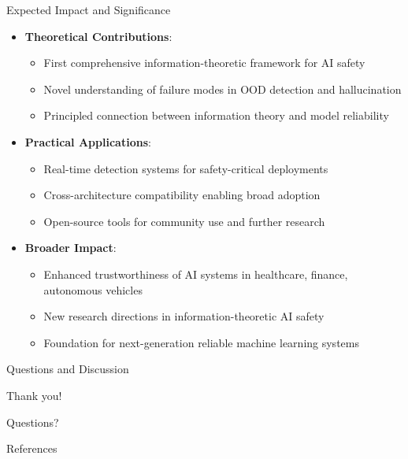 \documentclass[aspectratio=169]{beamer}
\begin{document}
\begin{frame}{Expected Impact and Significance}
\begin{itemize}
    \item \textbf{Theoretical Contributions}:
    \begin{itemize}
        \item First comprehensive information-theoretic framework for AI safety
        \item Novel understanding of failure modes in OOD detection and hallucination
        \item Principled connection between information theory and model reliability
    \end{itemize}
    \item \textbf{Practical Applications}:
    \begin{itemize}
        \item Real-time detection systems for safety-critical deployments
        \item Cross-architecture compatibility enabling broad adoption
        \item Open-source tools for community use and further research
    \end{itemize}
    \item \textbf{Broader Impact}:
    \begin{itemize}
        \item Enhanced trustworthiness of AI systems in healthcare, finance, autonomous vehicles
        \item New research directions in information-theoretic AI safety
        \item Foundation for next-generation reliable machine learning systems
    \end{itemize}
\end{itemize}
\end{frame}

\begin{frame}{Questions and Discussion}
\begin{center}
\Huge Thank you!

\vspace{2cm}

\Large Questions?
\end{center}
\end{frame}

\begin{frame}[allowframebreaks]{References}
\footnotesize

\end{frame}
\end{document}
